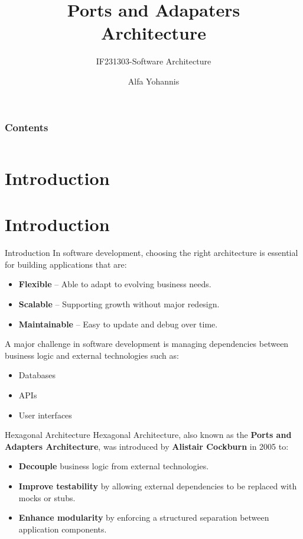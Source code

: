 \documentclass[aspectratio=169, table]{beamer}
\title{\Huge Ports and Adapaters\\Architecture\\\vspace{10pt}}
\subtitle{IF231303-Software Architecture}
\author{Alfa Yohannis}
\begin{document}
	\begin{frame}[plain]
		\maketitle
	\end{frame}

	\begin{frame}[fragile]
		\frametitle{Contents}
		
		\begin{columns}[t]
			\tableofcontents[sections={1-6}]
			
			\tableofcontents[sections={7-12}]
		\end{columns}
	\end{frame}

\section{Introduction}

\section{Introduction}

\begin{frame}[fragile]{Introduction}
	\vspace{20pt}
	In software development, choosing the right architecture is essential for building applications that are:
	\begin{itemize}
		\item \textbf{Flexible} – Able to adapt to evolving business needs.
		\item \textbf{Scalable} – Supporting growth without major redesign.
		\item \textbf{Maintainable} – Easy to update and debug over time.
	\end{itemize}
	A major challenge in software development is managing dependencies between business logic and external technologies such as:
	\begin{itemize}
		\item Databases
		\item APIs
		\item User interfaces
	\end{itemize}
\end{frame}

\begin{frame}[fragile]{Hexagonal Architecture}
	\vspace{20pt}
	Hexagonal Architecture, also known as the \textbf{Ports and Adapters Architecture}, was introduced by \textbf{Alistair Cockburn} in 2005 to:
	\begin{itemize}
		\item \textbf{Decouple} business logic from external technologies.
		\item \textbf{Improve testability} by allowing external dependencies to be replaced with mocks or stubs.
		\item \textbf{Enhance modularity} by enforcing a structured separation between application components.
	\end{itemize}
\end{frame}
\end{document}
